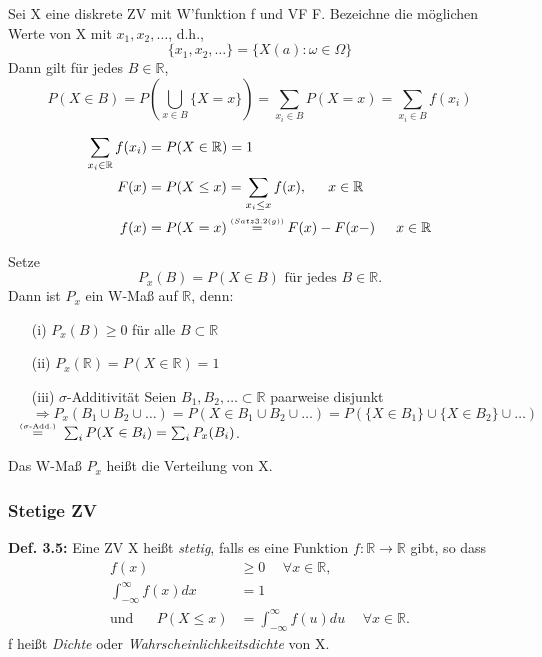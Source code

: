 \documentclass[a4paper,11pt]{article}
\newcommand\eqsigmaadd{\overset{\mathclap{\scriptscriptstyle (\sigma\text{-Add.})}}{=}}
\newcommand\eqthreetwog{\overset{\mathclap{\scriptscriptstyle (Satz 3.2(g))}}{=}}
\begin{document}
\vspace{6pt}
\noindent Sei X eine diskrete ZV mit W'funktion f und VF F. Bezeichne die möglichen Werte von X mit $x_1,x_2,\dots$, d.h., 
\[\{x_1,x_2,\dots\}=\{X(a):\omega\in\Omega\}\]
Dann gilt für jedes $B\in\mathbb{R}$,
\[P(X\in B)=P(\bigcup_{x\in B}\{X=x\})=\sum_{x_i\in B}P(X=x)=\sum_{x_i\in B}f(x_i)\]

\begin{align*}
\sum_{x_i\in\mathbb{R}}f(x_i) &= P(X\in\mathbb{R})=1 \\ 
F(x) &= P(X\leq x) = \sum_{x_i\leq x}f(x), \hspace{15pt}x\in\mathbb{R}\\
f(x) &= P(X=x)\hspace{15pt}\eqthreetwog \hspace{15pt} F(x)-F(x-) \hspace{15pt} x\in\mathbb{R}\\
\end{align*}

\vspace{6pt}
\noindent Setze
\[P_x(B)=P(X\in B) \text{ für jedes } B\in\mathbb{R}.\]
Dann ist $P_x$ ein W-Maß auf $\mathbb{R}$, denn:
\begin{itemize}
\item[(i)] $P_x(B)\geq 0$ für alle $B\subset\mathbb{R}$
\item[(ii)] $P_x(\mathbb{R})=P(X\in\mathbb{R})=1$
\item[(iii)] $\sigma$-Additivität
    \newline Seien $B_1,B_2,\dots\subset\mathbb{R}$ paarweise disjunkt
    \newline $\Rightarrow P_x(B_1\cup B_2\cup\dots)=P(X\in B_1\cup B_2\cup\dots) = P(\{X\in B_1\}\cup\{X\in B_2\}\cup\dots)$
    \newline $ \eqsigmaadd \hspace{12pt}\sum_{i}P(X\in B_i)=\sum_{i}P_x(B_i)$.
\end{itemize}
Das W-Maß $P_x$ heißt die Verteilung von X.

\subsubsection{Stetige ZV}
\vspace{6pt}
\noindent\textbf{Def. 3.5:} Eine ZV X heißt \textit{stetig}, falls es eine Funktion $f:\mathbb{R}\rightarrow\mathbb{R}$ gibt, so dass 
\begin{align*}
f(x) &\geq 0 \hspace{15pt}\forall x\in\mathbb{R},\\
\int_{-\infty}^{\infty}f(x)dx &= 1 \\
\text{und}\hspace{20pt}P(X\leq x) &= \int_{-\infty}^{\infty}f(u)du \hspace{15pt}\forall x\in\mathbb{R}.
\end{align*}
f heißt \textit{Dichte} oder \textit{Wahrscheinlichkeitsdichte} von X.
\end{document}
